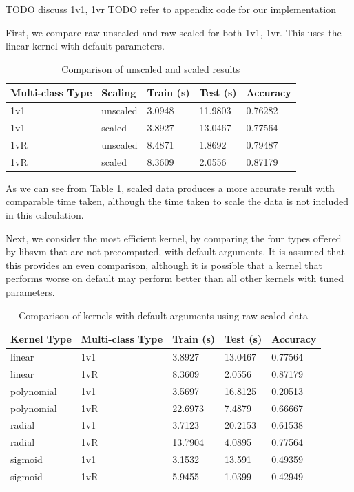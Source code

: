 \documentclass[a4paper, 10pt, conference]{ieeeconf}
\begin{document}
TODO discuss 1v1, 1vr
TODO refer to appendix code for our implementation

First, we compare raw unscaled and raw scaled for both 1v1, 1vr. This uses the linear kernel with default parameters.

\begin{table}
\centering
\label{tbl:scaling}
\caption{Comparison of unscaled and scaled results}
\begin{tabular}{lllll}
Multi-class Type & Scaling & Train (s) & Test (s) & Accuracy\\ \hline
1v1 & unscaled & 3.0948 & 11.9803 & 0.76282\\ \hline
1v1 & scaled & 3.8927 & 13.0467 & 0.77564\\ \hline
1vR & unscaled & 8.4871 & 1.8692 & 0.79487\\ \hline
1vR & scaled & 8.3609 & 2.0556 & 0.87179\\ \hline
\end{tabular}
\end{table}

As we can see from Table \ref{tbl:scaling}, scaled data produces a more accurate result with comparable time taken, although the time taken to scale the data is not included in this calculation.

Next, we consider the most efficient kernel, by comparing the four types offered by libsvm that are not precomputed, with default arguments. It is assumed that this provides an even comparison, although it is possible that a kernel that performs worse on default may perform better than all other kernels with tuned parameters.

\begin{table}
\centering
\label{tbl:kernel_raw}
\caption{Comparison of kernels with default arguments using raw scaled data}
\begin{tabular}{lllll}
Kernel Type & Multi-class Type & Train (s) & Test (s) & Accuracy\\ \hline
linear & 1v1 & 3.8927 & 13.0467 & 0.77564\\ \hline
linear & 1vR & 8.3609 & 2.0556 & 0.87179\\ \hline
polynomial & 1v1 & 3.5697 & 16.8125 & 0.20513\\ \hline
polynomial & 1vR & 22.6973 & 7.4879 & 0.66667\\ \hline
radial & 1v1 & 3.7123 & 20.2153 & 0.61538\\ \hline
radial & 1vR & 13.7904 & 4.0895 & 0.77564\\ \hline
sigmoid & 1v1 & 3.1532 & 13.591 & 0.49359\\ \hline
sigmoid & 1vR & 5.9455 & 1.0399 & 0.42949\\ \hline
\end{tabular}
\end{table}
\end{document}
